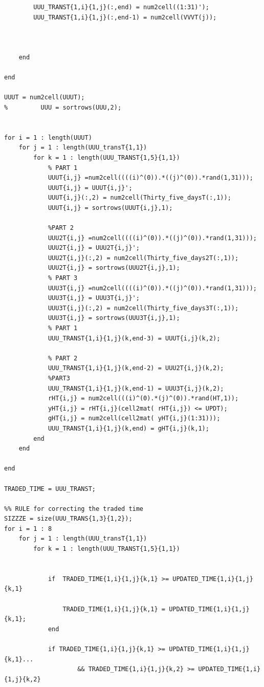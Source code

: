 \documentclass{DissertateUSU}
\begin{document}
\begin{verbatim}
        UUU_TRANST{1,i}{1,j}(:,end) = num2cell((1:31)');
        UUU_TRANST{1,i}{1,j}(:,end-1) = num2cell(VVVT(j));
        
        
        
    end
    
end

UUUT = num2cell(UUUT);
%         UUU = sortrows(UUU,2);


for i = 1 : length(UUUT)
    for j = 1 : length(UUU_transT{1,1})
        for k = 1 : length(UUU_TRANST{1,5}{1,1})
            % PART 1
            UUUT{i,j} =num2cell((((i)^(0)).*((j)^(0)).*rand(1,31)));
            UUUT{i,j} = UUUT{i,j}';
            UUUT{i,j}(:,2) = num2cell(Thirty_five_daysT(:,1));
            UUUT{i,j} = sortrows(UUUT{i,j},1);
            
            %PART 2
            UUU2T{i,j} =num2cell((((i)^(0)).*((j)^(0)).*rand(1,31)));
            UUU2T{i,j} = UUU2T{i,j}';
            UUU2T{i,j}(:,2) = num2cell(Thirty_five_days2T(:,1));
            UUU2T{i,j} = sortrows(UUU2T{i,j},1);
            % PART 3
            UUU3T{i,j} =num2cell((((i)^(0)).*((j)^(0)).*rand(1,31)));
            UUU3T{i,j} = UUU3T{i,j}';
            UUU3T{i,j}(:,2) = num2cell(Thirty_five_days3T(:,1));
            UUU3T{i,j} = sortrows(UUU3T{i,j},1);
            % PART 1
            UUU_TRANST{1,i}{1,j}(k,end-3) = UUUT{i,j}(k,2);
            
            % PART 2
            UUU_TRANST{1,i}{1,j}(k,end-2) = UUU2T{i,j}(k,2);
            %PART3
            UUU_TRANST{1,i}{1,j}(k,end-1) = UUU3T{i,j}(k,2);
            rHT{i,j} = num2cell(((i)^(0).*(j)^(0)).*rand(HT,1));
            yHT{i,j} = rHT{i,j}(cell2mat( rHT{i,j}) <= UPDT);
            gHT{i,j} = num2cell(cell2mat( yHT{i,j}(1:31)));
            UUU_TRANST{1,i}{1,j}(k,end) = gHT{i,j}(k,1);
        end
    end
    
end

TRADED_TIME = UUU_TRANST;

%% RULE for correcting the traded time
SIZZZE = size(UUU_TRANS{1,3}{1,2});
for i = 1 : 8
    for j = 1 : length(UUU_transT{1,1})
        for k = 1 : length(UUU_TRANST{1,5}{1,1})
            
            
            if  TRADED_TIME{1,i}{1,j}{k,1} >= UPDATED_TIME{1,i}{1,j}{k,1}
                
                TRADED_TIME{1,i}{1,j}{k,1} = UPDATED_TIME{1,i}{1,j}{k,1};
            end
                
            if TRADED_TIME{1,i}{1,j}{k,1} >= UPDATED_TIME{1,i}{1,j}{k,1}...
                    && TRADED_TIME{1,i}{1,j}{k,2} >= UPDATED_TIME{1,i}{1,j}{k,2}
                

\end{verbatim}
\end{document}
